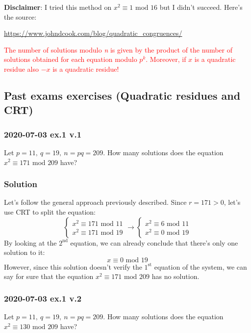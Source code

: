 \documentclass[11pt, a4paper]{article}
\newcommand{\mymod}{
    \text{ mod }
}
\begin{document}
\begin{itemize}
\begin{itemize}
\begin{itemize}
            \textbf{Disclaimer}: I tried this method on $x^2\equiv1\mymod16$ but I didn't succeed. Here's the source:
            \begin{center}
                \textcolor{blue}{\url{https://www.johndcook.com/blog/quadratic_congruences/}}
            \end{center}
        \end{itemize}
    \end{itemize}
    \textcolor{red}{The number of solutions modulo \textit{n} is given by the product of the number of solutions obtained for each equation modulo $p^k$. Moreover, if $x$ is a quadratic residue also $-x$ is a quadratic residue!}
\end{itemize}

\newpage
\subsection{Past exams exercises (Quadratic residues and CRT)}
\subsubsection{2020-07-03 ex.1 v.1}
Let $p=11,\ q=19,\ n=pq=209$. How many solutions does the equation $x^2\equiv171\mymod209$ have?
\subsubsection*{Solution}
Let's follow the general approach previously described. Since $r=171>0$, let's use CRT to split the equation:
\begin{equation*}
    \begin{cases}
        x^2\equiv171\mymod11\\
        x^2\equiv171\mymod19
    \end{cases}\longrightarrow
    \begin{cases}
        x^2\equiv6\mymod11\\
        x^2\equiv0\mymod19
    \end{cases}
\end{equation*}
By looking at the $2^{\text{nd}}$ equation, we can already conclude that there's only one solution to it:
$$x\equiv0\mymod19$$
However, since this solution doesn't verify the $1^{\text{st}}$ equation of the system, we can say for sure that the equation $x^2\equiv171\mymod209$ has no solution.

\subsubsection{2020-07-03 ex.1 v.2}
Let $p=11,\ q=19,\ n=pq=209$. How many solutions does the equation $x^2\equiv130\mymod209$ have?
\end{document}
